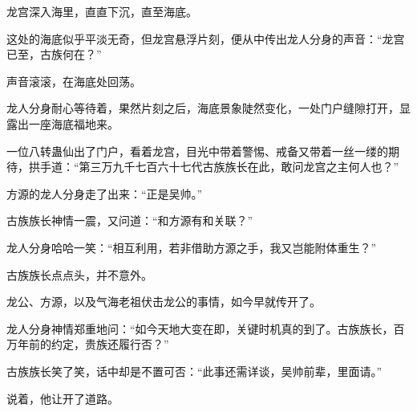 \begin{this_body}
龙宫深入海里，直直下沉，直至海底。

这处的海底似乎平淡无奇，但龙宫悬浮片刻，便从中传出龙人分身的声音：“龙宫已至，古族何在？”

声音滚滚，在海底处回荡。

龙人分身耐心等待着，果然片刻之后，海底景象陡然变化，一处门户缝隙打开，显露出一座海底福地来。

一位八转蛊仙出了门户，看着龙宫，目光中带着警惕、戒备又带着一丝一缕的期待，拱手道：“第三万九千七百六十七代古族族长在此，敢问龙宫之主何人也？”

方源的龙人分身走了出来：“正是吴帅。”

古族族长神情一震，又问道：“和方源有和关联？”

龙人分身哈哈一笑：“相互利用，若非借助方源之手，我又岂能附体重生？”

古族族长点点头，并不意外。

龙公、方源，以及气海老祖伏击龙公的事情，如今早就传开了。

龙人分身神情郑重地问：“如今天地大变在即，关键时机真的到了。古族族长，百万年前的约定，贵族还履行否？”

古族族长笑了笑，话中却是不置可否：“此事还需详谈，吴帅前辈，里面请。”

说着，他让开了道路。

\end{this_body}

